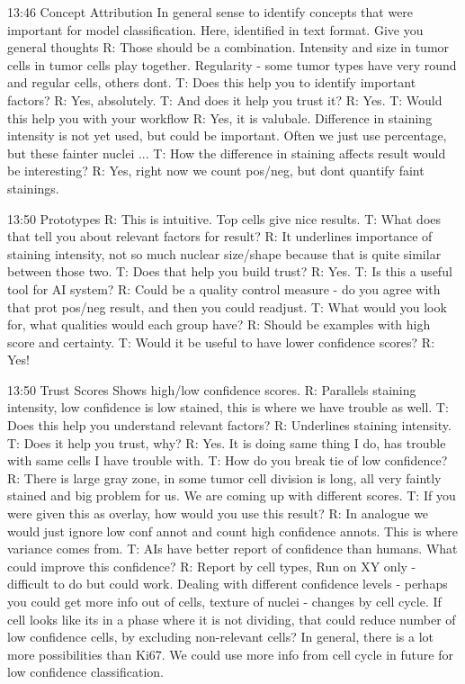 13:46 Concept Attribution
In general sense to identify concepts that were important for model classification. Here, identified in text format. Give you general thoughts
R: Those should be a combination. Intensity and size in tumor cells in tumor cells play together. Regularity - some tumor types have very round and regular cells, others dont.
T: Does this help you to identify important factors? R: Yes, absolutely.
T: And does it help you trust it? R: Yes.
T: Would this help you with your workflow R: Yes, it is valubale. Difference in staining intensity is not yet used, but could be important. Often we just use percentage, but these fainter nuclei ... T: How the difference in staining affects result would be interesting? R: Yes, right now we count pos/neg, but dont quantify faint stainings.

13:50 Prototypes
R: This is intuitive. Top cells give nice results. T: What does that tell you about relevant factors for result? R: It underlines importance of staining intensity, not so much nuclear size/shape because that is quite similar between those two. T: Does that help you build trust? R: Yes.
T: Is this a useful tool for AI system? R: Could be a quality control measure - do you agree with that prot pos/neg result, and then you could readjust. 
T: What would you look for, what qualities would each group have? R: Should be examples with high score and certainty. T: Would it be useful to have lower confidence scores? R: Yes!

13:50 Trust Scores
Shows high/low confidence scores.
R: Parallels staining intensity, low confidence is low stained, this is where we have trouble as well.
T: Does this help you understand relevant factors? R: Underlines staining intensity.
T: Does it help you trust, why? R: Yes. It is doing same thing I do, has trouble with same cells I have trouble with. 
T: How do you break  tie of low confidence? R: There is large gray zone, in some tumor cell division is long, all very faintly stained and big problem for us. We are coming up with different scores.
T: If you were given this as overlay, how would you use this result? R: In analogue we would just ignore low conf annot and count high confidence annots. This is where variance comes from.
T: AIs have better report of confidence than humans. What could improve this confidence? R: Report by cell types, Run on XY only - difficult to do but could work. Dealing with different confidence levels - perhaps you could get more info out of cells, texture of nuclei - changes by cell cycle. If cell looks like its in a phase where it is not dividing, that could reduce number of low confidence cells, by excluding non-relevant cells? In general, there is a lot more possibilities than Ki67. We could use more info from cell cycle in future for low confidence classification.

